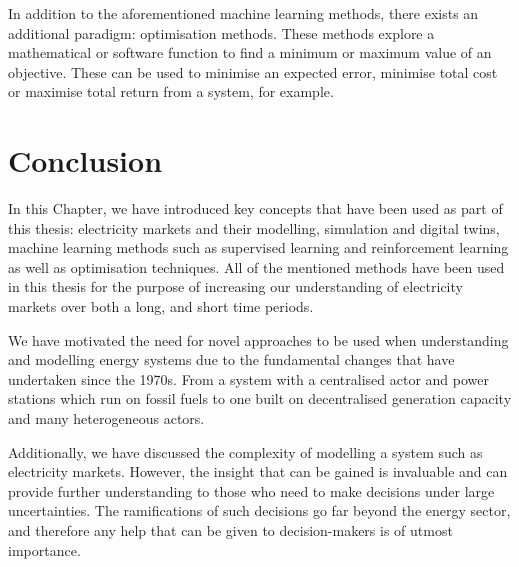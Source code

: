 In addition to the aforementioned machine learning methods, there exists an additional paradigm: optimisation methods. These methods explore a mathematical or software function to find a minimum or maximum value of an objective. These can be used to minimise an expected error, minimise total cost or maximise total return from a system, for example.





\section{Conclusion}
\label{sec:intro:conclusion}

In this Chapter, we have introduced key concepts that have been used as part of this thesis: electricity markets and their modelling, simulation and digital twins, machine learning methods such as supervised learning and reinforcement learning as well as optimisation techniques. All of the mentioned methods have been used in this thesis for the purpose of increasing our understanding of electricity markets over both a long, and short time periods.

We have motivated the need for novel approaches to be used when understanding and modelling energy systems due to the fundamental changes that have undertaken since the 1970s. From a system with a centralised actor and power stations which run on fossil fuels to one built on decentralised generation capacity and many heterogeneous actors. 

Additionally, we have discussed the complexity of modelling a system such as electricity markets. However, the insight that can be gained is invaluable and can provide further understanding to those who need to make decisions under large uncertainties. The ramifications of such decisions go far beyond the energy sector, and therefore any help that can be given to decision-makers is of utmost importance.


